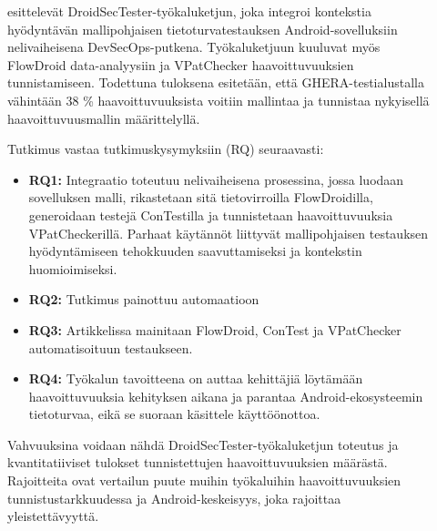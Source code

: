 \documentclass[bscthesis,finnish,oneside,biblatex]{uefcsthesis}
\begin{document}
    \begin{description}
        \item[\cite{baheux2023_droidsectester}] esittelevät DroidSecTester-työkaluketjun, joka integroi kontekstia hyödyntävän mallipohjaisen tietoturvatestauksen Android-sovelluksiin nelivaiheisena DevSecOps-putkena. Työkaluketjuun kuuluvat myös FlowDroid data-analyysiin ja VPatChecker haavoittuvuuksien tunnistamiseen. Todettuna tuloksena esitetään, että GHERA-testialustalla vähintään 38 \% haavoittuvuuksista voitiin mallintaa ja tunnistaa nykyisellä haavoittuvuusmallin määrittelyllä.

        Tutkimus vastaa tutkimuskysymyksiin (RQ) seuraavasti:
        \begin{itemize}
            \item \textbf{RQ1:} Integraatio toteutuu nelivaiheisena prosessina, jossa luodaan sovelluksen malli, rikastetaan sitä tietovirroilla FlowDroidilla, generoidaan testejä ConTestilla ja tunnistetaan haavoittuvuuksia VPatCheckerillä. Parhaat käytännöt liittyvät mallipohjaisen testauksen hyödyntämiseen tehokkuuden saavuttamiseksi ja kontekstin huomioimiseksi.
            \item \textbf{RQ2:} Tutkimus painottuu automaatioon
            \item \textbf{RQ3:} Artikkelissa mainitaan FlowDroid, ConTest ja VPatChecker automatisoituun testaukseen.
            \item \textbf{RQ4:} Työkalun tavoitteena on auttaa kehittäjiä löytämään haavoittuvuuksia kehityksen aikana ja parantaa Android-ekosysteemin tietoturvaa, eikä se suoraan käsittele käyttöönottoa.
        \end{itemize}

        Vahvuuksina voidaan nähdä DroidSecTester-työkaluketjun toteutus ja kvantitatiiviset tulokset tunnistettujen haavoittuvuuksien määrästä. Rajoitteita ovat vertailun puute muihin työkaluihin haavoittuvuuksien tunnistustarkkuudessa ja Android-keskeisyys, joka rajoittaa yleistettävyyttä.
    \end{description}
\end{document}
